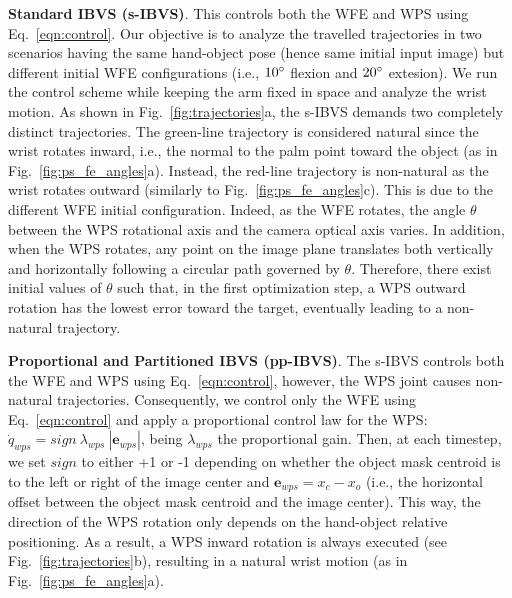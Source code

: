 \noindent\textbf{Standard IBVS (s-IBVS)}. This controls both the WFE and WPS using Eq.~\eqref{eqn:control}. Our objective is to analyze the travelled trajectories in two scenarios having the same hand-object pose (hence same initial input image) but different initial WFE configurations (i.e., $10\degree$ flexion and $20\degree$ extesion). We run the control scheme while keeping the arm fixed in space and analyze the wrist motion. As shown in Fig.~\ref{fig:trajectories}a, the s-IBVS demands two completely distinct trajectories. The green-line trajectory is considered natural since the wrist rotates inward, i.e., the normal to the palm point toward the object (as in Fig.~\ref{fig:ps_fe_angles}a). Instead, the red-line trajectory is non-natural as the wrist rotates outward (similarly to Fig.~\ref{fig:ps_fe_angles}c). This is due to the different WFE initial configuration. Indeed, as the WFE rotates, the angle $\theta$ between the WPS rotational axis and the camera optical axis varies. In addition, when the WPS rotates, any point on the image plane translates both vertically and horizontally following a circular path governed by $\theta$. Therefore, there exist initial values of $\theta$ such that, in the first optimization step, a WPS outward rotation has the lowest error toward the target, eventually leading to a non-natural trajectory.

\noindent \textbf{Proportional and Partitioned IBVS (pp-IBVS)}. The s-IBVS controls both the WFE and WPS using Eq.~\eqref{eqn:control}, however, the WPS joint causes non-natural trajectories. Consequently, we control only the WFE using Eq.~\eqref{eqn:control} and apply a proportional control law for the WPS: $\dot{q}_{wps} = sign \: \lambda_{wps} \: | \mathbf{e}_{wps} |$, being $\lambda_{wps}$ the proportional gain. Then, at each timestep, we set $sign$ to either +1 or -1 depending on whether the object mask centroid is to the left or right of the image center and $\mathbf{e}_{wps} = x_c - x_o$ (i.e., the horizontal offset between the object mask centroid and the image center). This way, the direction of the WPS rotation only depends on the hand-object relative positioning. As a result, a WPS inward rotation is always executed (see Fig.~\ref{fig:trajectories}b), resulting in a natural wrist motion (as in Fig.~\ref{fig:ps_fe_angles}a).



